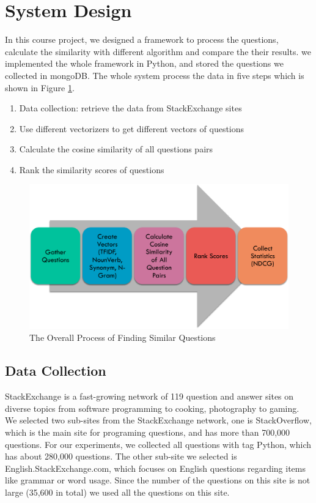 \documentclass{acm_proc_article-sp}
\begin{document}
\section{System Design}
In this course project, we designed a framework to process the questions, 
calculate the similarity with different algorithm and compare the their results. 
we implemented the whole framework in Python, and stored the questions we collected in mongoDB.  
The whole system process the data in five steps which  is shown in Figure \ref{fig:structure}.
\begin{enumerate}[noitemsep]
	\item Data collection:  retrieve the data from StackExchange sites 
	\item Use different vectorizers to get different vectors of questions 
	\item Calculate the cosine similarity of all questions pairs
	\item Rank  the similarity scores of questions
\end{enumerate}

\begin{figure}[h]
\centering
\includegraphics[width=1\columnwidth]{images/overall_structure.pdf}
\caption{The Overall Process of  Finding Similar Questions}
\label{fig:structure}
\end{figure}


\subsection{Data Collection}
StackExchange is a fast-growing network of 119 question and answer sites on diverse topics from software programming to cooking, photography to gaming. We selected two sub-sites from the StackExchange network, one is StackOverflow, which is the main site for programing questions, and has more than 700,000 questions. For our experiments, we collected all questions with tag Python, which has about 280,000 questions. The other sub-site we selected is English.StackExchange.com, which focuses on English questions regarding items like grammar or word usage. Since the number of the questions on this site is not large (35,600 in total) we used all the questions on this site.  
\end{document}

